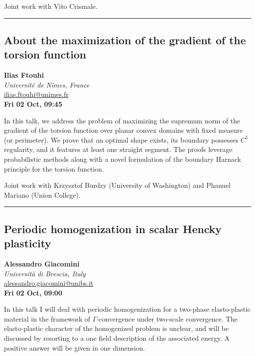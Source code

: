 \documentclass[a4paper,11pt]{article}
\begin{document}
\smallskip
Joint work with Vito Crismale.

\newpage

\noindent\rule{\textwidth}{0.4pt}

\begin{center}
\subsection*{About the maximization of the gradient of the torsion function}

\textbf{Ilias Ftouhi} \\
\textit{Université de Nîmes, France} \\
\url{ilias.ftouhi@unimes.fr} \\
\textbf{Fri 02 Oct, 09:45}
\
\end{center}
\medskip
In this talk, we address the problem of maximizing the supremum norm of the gradient of the torsion function over planar convex domains with fixed measure (or perimeter). We prove that an optimal shape exists, its boundary possesses $C^1$ regularity, and it features at least one straight segment. The proofs leverage probabilistic methods along with a novel formulation of the boundary Harnack principle for the torsion function.

\smallskip
Joint work with Krzysztof Burdzy (University of Washington) and Phanuel Mariano (Union College).

\newpage

\noindent\rule{\textwidth}{0.4pt}

\begin{center}
\subsection*{Periodic homogenization in scalar Hencky plasticity}

\textbf{Alessandro Giacomini} \\
\textit{Università di Brescia, Italy} \\
\url{alessandro.giacomini@unibs.it} \\
\textbf{Fri 02 Oct, 09:00}
\
\end{center}
\medskip
In this talk I will deal with periodic homogenization for a two-phase elasto-plastic material in the framework of $\Gamma$-convergence under two-scale convergence. The elasto-plastic character of the homogenized problem is unclear, and will be discussed by resorting to a one field description of the associated energy. A positive answer will be given in one dimension.
\end{document}
